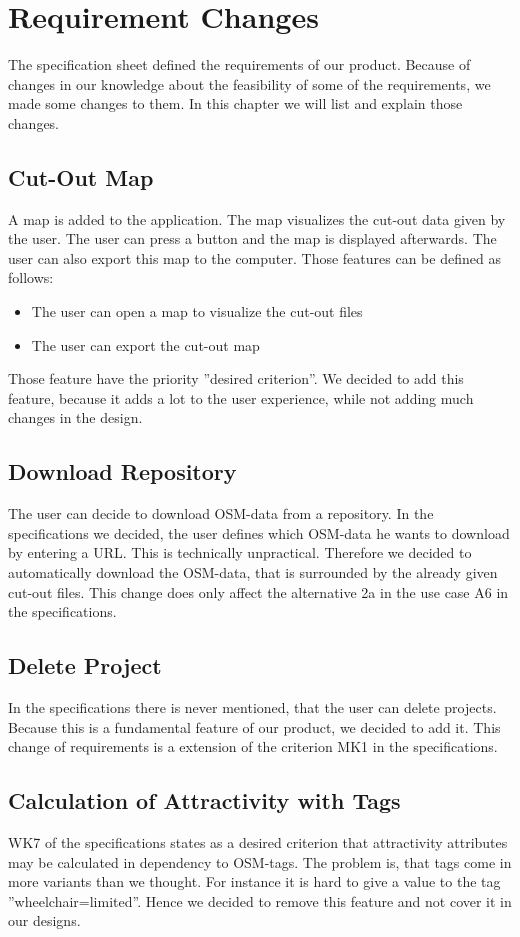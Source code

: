 \documentclass[parskip=full]{report} %
\begin{document}
\chapter{Requirement Changes}
The specification sheet defined the requirements of our product. Because of changes in our knowledge about the feasibility of some of the requirements, we made some changes to them. In this chapter we will list and explain those changes.

\section*{Cut-Out Map}
A map is added to the application. The map visualizes the cut-out data given by the user. The user can press a button and the map is displayed afterwards. The user can also export this map to the computer. Those features can be defined as follows:
\begin{itemize}
    \item <WK9> The user can open a map to visualize the cut-out files
    \item <WK10> The user can export the cut-out map
\end{itemize}
Those feature have the priority ''desired criterion''. We decided to add this feature, because it adds a lot to the user experience, while not adding much changes in the design.

\section*{Download Repository}
The user can decide to download OSM-data from a repository. In the specifications we decided, the user defines which OSM-data he wants to download by entering a URL. This is technically unpractical. Therefore we decided to automatically download the OSM-data, that is surrounded by the already given cut-out files. This change does only affect the alternative 2a in the use case A6 in the specifications.

\section*{Delete Project}
In the specifications there is never mentioned, that the user can delete projects. Because this is a fundamental feature of our product, we decided to add it. This change of requirements is a extension of the criterion MK1 in the specifications.

\section*{Calculation of Attractivity with Tags}
WK7 of the specifications states as a desired criterion that attractivity attributes may be calculated in dependency to OSM-tags. The problem is, that tags come in more variants than we thought. For instance it is hard to give a value to the tag ''wheelchair=limited''. Hence we decided to remove this feature and not cover it in our designs.
\end{document}
